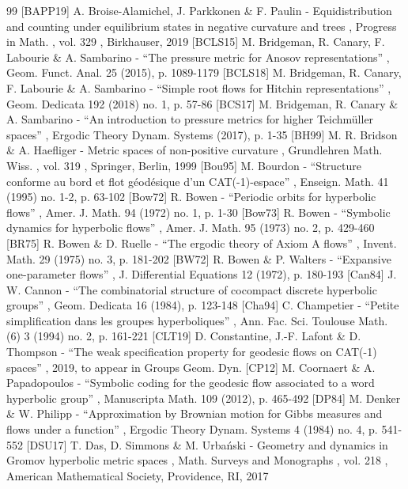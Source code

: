 \documentclass[11pt]{article}
\theoremstyle{definition}
\numberwithin{equation}{section}
\begin{document}
\begin{thebibliography}{99}
 [BAPP19] A. Broise-Alamichel, J. Parkkonen \& F. Paulin - Equidistribution and counting under equilibrium states in negative curvature and trees , Progress in Math. , vol. 329 , Birkhauser, 2019
 [BCLS15] M. Bridgeman, R. Canary, F. Labourie \& A. Sambarino - “The pressure metric for Anosov representations” , Geom. Funct. Anal. 25 (2015), p. 1089-1179
 [BCLS18] M. Bridgeman, R. Canary, F. Labourie \& A. Sambarino - “Simple root flows for Hitchin representations” , Geom. Dedicata 192 (2018) no. 1, p. 57-86
 [BCS17] M. Bridgeman, R. Canary \& A. Sambarino - “An introduction to pressure metrics for higher Teichmüller spaces” , Ergodic Theory Dynam. Systems (2017), p. 1-35
 [BH99] M. R. Bridson \& A. Haefliger - Metric spaces of non-positive curvature , Grundlehren Math. Wiss. , vol. 319 , Springer, Berlin, 1999
 [Bou95] M. Bourdon - “Structure conforme au bord et flot géodésique d’un CAT(-1)-espace” , Enseign. Math. 41 (1995) no. 1-2, p. 63-102
 [Bow72] R. Bowen - “Periodic orbits for hyperbolic flows” , Amer. J. Math. 94 (1972) no. 1, p. 1-30
 [Bow73] R. Bowen - “Symbolic dynamics for hyperbolic flows” , Amer. J. Math. 95 (1973) no. 2, p. 429-460
 [BR75] R. Bowen \& D. Ruelle - “The ergodic theory of Axiom A flows” , Invent. Math. 29 (1975) no. 3, p. 181-202
 [BW72] R. Bowen \& P. Walters - “Expansive one-parameter flows” , J. Differential Equations 12 (1972), p. 180-193
 [Can84] J. W. Cannon - “The combinatorial structure of cocompact discrete hyperbolic groups” , Geom. Dedicata 16 (1984), p. 123-148
 [Cha94] C. Champetier - “Petite simplification dans les groupes hyperboliques” , Ann. Fac. Sci. Toulouse Math. (6) 3 (1994) no. 2, p. 161-221
 [CLT19] D. Constantine, J.-F. Lafont \& D. Thompson - “The weak specification property for geodesic flows on CAT(-1) spaces” , 2019, to appear in Groups Geom. Dyn.
 [CP12] M. Coornaert \& A. Papadopoulos - “Symbolic coding for the geodesic flow associated to a word hyperbolic group” , Manuscripta Math. 109 (2012), p. 465-492
 [DP84] M. Denker \& W. Philipp - “Approximation by Brownian motion for Gibbs measures and flows under a function” , Ergodic Theory Dynam. Systems 4 (1984) no. 4, p. 541-552
 [DSU17] T. Das, D. Simmons \& M. Urbański - Geometry and dynamics in Gromov hyperbolic metric spaces , Math. Surveys and Monographs , vol. 218 , American Mathematical Society, Providence, RI, 2017

\end{thebibliography}
\end{document}
